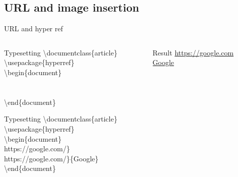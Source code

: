 \documentclass[10pt,xcolor={dvipsnames}]{beamer}
\begin{document}
	\subsection{URL and image insertion}
		\begin{frame}{URL and hyper ref}
			\begin{columns}[T]
				
				\begin{column}{.6 \textwidth}
					\onslide<2->
					\begin{block}{Typesetting}
						\textbackslash documentclass\{{\color{blue}article}\}\\
						\textbackslash usepackage\{{\color{orange}hyperref}\}\\
						\textbackslash begin\{{\color{blue}document}\}\\
							\\
							\\
						\textbackslash end\{{\color{blue}document}\}\\
					\end{block}
					
					\onslide<3->
					\begin{example}{Typesetting}
						\textbackslash documentclass\{{\color{blue}article}\}\\
						\textbackslash usepackage\{{\color{orange}hyperref}\}\\
						\textbackslash begin\{{\color{blue}document}\}\\
							https://google.com/{\color{orange}\}}\\
							https://google.com/{\color{orange}\}\{}Google{\color{orange}\}}\\
						\textbackslash end\{{\color{blue}document}\}\\
					\end{example}
				\end{column}
			
			
				\onslide<4->
				\begin{column}{.4 \textwidth}
					\vspace{2cm}
					\begin{block}{Result}
						\url{https://google.com}\\
						\href{https://google.com}{Google}
					\end{block}
				\end{column}
			\end{columns}
		
		\end{frame}
	
\end{document}
